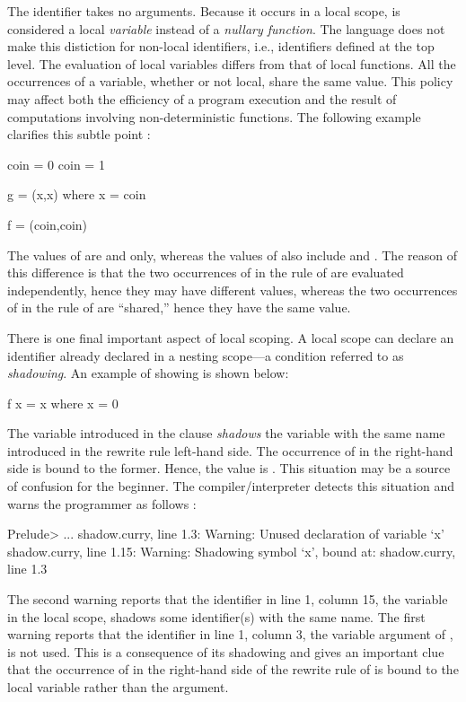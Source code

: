 The identifier  takes no arguments.
Because it occurs in a local scope,
 is considered
a local \emph{variable}
instead of a \emph{nullary function}.
The language does not make this distiction for non-local
identifiers, i.e., identifiers defined at the top level.
The evaluation of local variables differs from that of local functions.
All the occurrences of a variable,
whether or not local, share the same value.
This policy may affect both the efficiency of a program execution
and the result of computations involving non-deterministic
functions.  The following example clarifies this subtle point
:
%
\begin{curry}
coin = 0
coin = 1

g = (x,x) where x = coin

f = (coin,coin)
\end{curry}
%
The values of  are  and  only,
whereas the values of  also include 
 and .
The reason of this difference
is that the two occurrences of  in the rule of 
are evaluated independently, hence they may have different values,
whereas the two occurrences of 
in the rule of  are ``shared,'' hence they have the same value.

There is one final important aspect of local scoping.
A local scope can declare an identifier already declared
in a nesting scope---a condition referred to as
\emph{shadowing}.
An example of showing is shown below:
%
\begin{curry}
f x = x where x = 0
\end{curry}
%
The variable  introduced in the  clause
\emph{shadows} the variable with the same name introduced in
the rewrite rule left-hand side.
The occurrence of  in the right-hand side is
bound to the former.
Hence, the value  is .
This situation may be a source of confusion for the beginner.
The \pakcs{} compiler/interpreter detects this situation and
warns the programmer as follows
:
%
\begin{prog}
Prelude> 
...
shadow.curry, line 1.3: Warning:
    Unused declaration of variable `x'
shadow.curry, line 1.15: Warning:
    Shadowing symbol `x', bound at: shadow.curry, line 1.3
\end{prog}
%
The second warning reports that the identifier in line 1,
column 15, the variable  in the local scope,
shadows some identifier(s) with the same name.
The first warning reports that
the identifier in line 1, column 3,
the variable  argument of ,
is not used.  This is a consequence of its shadowing and
gives an important clue that the occurrence of 
in the right-hand side of the rewrite rule of 
is bound to the local variable rather than the argument.


